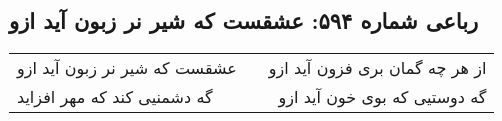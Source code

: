 \begin{center}
\section*{رباعی شماره ۵۹۴: عشقست که شیر نر زبون آید ازو}
\label{sec:sh594}
\begin{longtable}{l p{0.5cm} r}
عشقست که شیر نر زبون آید ازو
&&
از هر چه گمان بری فزون آید ازو
\\
گه دشمنیی کند که مهر افزاید
&&
گه دوستیی که بوی خون آید ازو
\\
\end{longtable}
\end{center}
